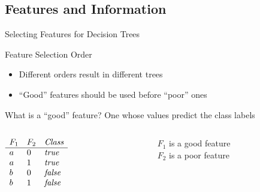 \documentclass[12pt]{beamer}
\newcommand{\EM}[1]{\mbox{\em#1}}
\begin{document}
\subsection{Features and Information}
\begin{frame}{Selecting Features for Decision Trees}
	\begin{block}{Feature Selection Order}
		\begin{itemize}
			\item Different orders result in different trees
			\item ``Good'' features should be used before ``poor'' ones
		\end{itemize}
	\end{block}
	\pause
	\begin{block}{What is a ``good'' feature?}
		One whose values predict the class labels \\
	\end{block}
	\pause
	\medskip
	\begin{columns}
		\begin{column}{1.2in}
			$
			\begin{array}{lll}
			F_1 & F_2 & \EM{Class} \\
			\hline
			a & 0 & \EM{true} \\
			a & 1 & \EM{true} \\
			b & 0 & \EM{false} \\
			b & 1 & \EM{false} \\
			\end{array}
			$
		\end{column}
		\pause
		\begin{column}{1.8in}
			$F_1$ is a \alert{good} feature \\
			\bigskip
			$F_2$ is a \alert{poor} feature
		\end{column}
	\end{columns}
\end{frame}
\end{document}
